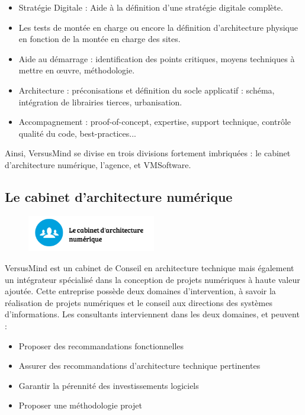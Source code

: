 \documentclass[12pt]{report}
\begin{document}
\begin{itemize}
\item Stratégie Digitale : Aide à la définition d’une stratégie digitale complète.
\item Les tests de montée en charge ou encore la définition d’architecture physique en fonction de la montée en charge des sites.
\item Aide au démarrage : identification des points critiques, moyens techniques à mettre en œuvre, méthodologie.
\item Architecture : préconisations et définition du socle applicatif : schéma, intégration de librairies tierces, urbanisation.
\item Accompagnement : proof-of-concept, expertise, support technique, contrôle qualité du code, best-practices...\\
\end{itemize}
  
Ainsi, VersusMind se divise en trois divisions fortement imbriquées : le cabinet d’architecture numérique, l’agence, et VMSoftware.\\

		\subsection{Le cabinet d'architecture numérique}
	
\begin{figure}[!h]
	\includegraphics[width=0.5\textwidth]{pictures/cabinet.png}
\end{figure}

VersusMind est un cabinet de Conseil en architecture technique mais également un intégrateur spécialisé dans la conception de projets numériques à haute valeur ajoutée. Cette entreprise possède deux domaines d’intervention, à savoir la réalisation de projets numériques et le conseil aux directions des systèmes d’informations. Les consultants interviennent dans les deux domaines, et peuvent : \\

\begin{itemize}
\item Proposer des recommandations fonctionnelles 
\item Assurer des recommandations d’architecture technique pertinentes 
\item Garantir la pérennité des investissements logiciels
\item Proposer une méthodologie projet \\
\end{itemize}
\end{document}
